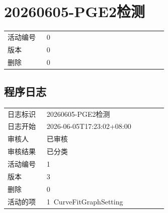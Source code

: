 \documentclass[UTF8,10pt,a4paper,fontset=fandol]{ctexart}
\newcommand{\fieldvalue}[1]{#1}
\begin{document}
\section*{20260605-PGE2检测}

\begin{tabular}{@{}p{0.22\linewidth}p{0.68\linewidth}@{}}
活动编号 &
\fieldvalue{0} \\

版本 &
\fieldvalue{0} \\

删除 &
\fieldvalue{0} \\
\end{tabular}

\subsection*{程序日志}

\begin{tabular}{@{}p{0.22\linewidth}p{0.68\linewidth}@{}}
日志标识 &
\fieldvalue{20260605-PGE2检测} \\

日志开始 &
\fieldvalue{2026-06-05T17:23:02+08:00} \\

审核人 &
\fieldvalue{已审核} \\

审核结果 &
\fieldvalue{已分类} \\[0.5em]

活动编号 &
\fieldvalue{1} \\

版本 &
\fieldvalue{3} \\

删除 &
\fieldvalue{0} \\

活动的项 &
\fieldvalue{1\ CurveFitGraphSetting} \\
\end{tabular}
\end{document}
